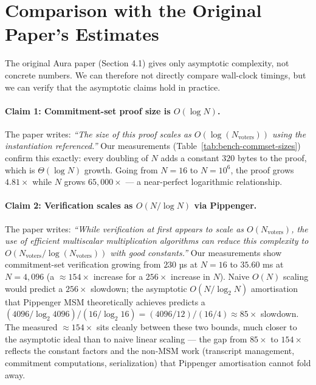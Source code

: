\documentclass[12pt,a4paper,oneside]{report}
\begin{document}
\section{Comparison with the Original Paper's Estimates}
\label{sec:bench-vs-paper}

The original Aura paper (Section 4.1) gives only asymptotic complexity, 
not concrete numbers. We can therefore not directly compare wall-clock 
timings, but we can verify that the asymptotic claims hold in practice.

\paragraph{Claim 1: Commitment-set proof size is $O(\log N)$.}
The paper writes: \emph{``The size of this proof scales as 
$O(\log(N_{\text{voters}}))$ using the instantiation referenced.''} 
Our measurements (Table~\ref{tab:bench-commset-sizes}) confirm this 
exactly: every doubling of $N$ adds a constant $320$ bytes to the proof, 
which is $\Theta(\log N)$ growth. Going from $N = 16$ to $N = 10^6$, the 
proof grows $4.81\times$ while $N$ grows $65{,}000\times$ --- a 
near-perfect logarithmic relationship.

\paragraph{Claim 2: Verification scales as $O(N / \log N)$ via Pippenger.}
The paper writes: \emph{``While verification at first appears to scale 
as $O(N_{\text{voters}})$, the use of efficient multiscalar multiplication 
algorithms can reduce this complexity to 
$O(N_{\text{voters}} / \log(N_{\text{voters}}))$ with good constants.''} 
Our measurements show commitment-set verification growing from $230$
µs at $N = 16$ to $35.60$ ms at $N = 4{,}096$ (a $\approx 154\times$
increase for a $256\times$ increase in $N$). Naive $O(N)$ scaling
would predict a $256\times$ slowdown; the asymptotic
$O(N / \log_2 N)$ amortisation that Pippenger MSM theoretically
achieves predicts a $(4096/\log_2 4096) / (16/\log_2 16)
= (4096/12) / (16/4) \approx 85\times$ slowdown. The measured
$\approx 154\times$ sits cleanly between these two bounds, much closer
to the asymptotic ideal than to naive linear scaling --- the gap from
$85\times$ to $154\times$ reflects the constant factors and the
non-MSM work (transcript management, commitment computations,
serialization) that Pippenger amortisation cannot fold away.
\end{document}
